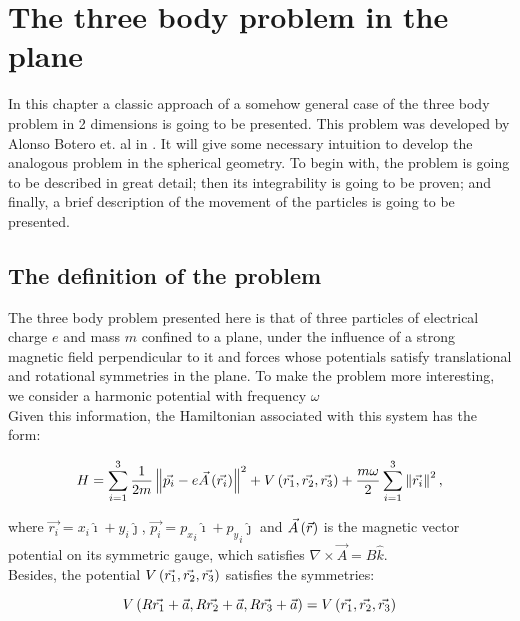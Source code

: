 \chapter{The three body problem in the plane}

In this chapter a classic approach of a somehow general case of the three body problem in 2 dimensions is going to be presented. This problem was developed by Alonso Botero et. al in \cite{alonso}. It will give some necessary intuition to develop the analogous problem in the spherical geometry. To begin with, the problem is going to be described in great detail; then its integrability is going to be proven; and finally, a brief description of the movement of the particles is going to be presented.\\

\section{The definition of the problem}

The three body problem presented here is that of three particles of electrical charge $e$ and mass $m$ confined to a plane, under the influence of a strong magnetic field perpendicular to it and forces whose potentials satisfy translational and rotational symmetries in the plane. To make the problem more interesting, we consider a harmonic potential with frequency $\omega$\\

Given this information, the Hamiltonian associated with this system has the form:

\begin{equation}
H = \sum_{i=1}^{3} \frac{1}{2m} \left\lVert  \vec{p_i} - 
e\vec{ A } \left( \vec{r_i} \right) \right\rVert^2
+ V \left(  \vec{r_1},\vec{r_2},\vec{r_3}  \right)
+\frac{m\omega}{2}\sum_{i=1}^{3} \left\lVert \vec{r_i} \right\rVert^2,
\label{eq:ham2d}
\end{equation}

where $\vec{r_i} = x_i \hat{\imath} + y_i \hat{\jmath}$, $\vec{p_i} = {p_x}_i\hat{\imath} + {p_y}_i\hat{\jmath}$ and $\vec{A}\left( \vec{r} \right)$ is the magnetic vector potential on its symmetric gauge, which satisfies $\nabla \times \vec{A} = B\hat{k}$.\\

Besides, the potential $V \left(  \vec{r_1},\vec{r_2},\vec{r_3}  \right)$ satisfies the symmetries:

\begin{equation}
V \left(  R\vec{r_1}+\vec{a},R\vec{r_2}+\vec{a},R\vec{r_3}+\vec{a}   \right)= V \left(  \vec{r_1},\vec{r_2},\vec{r_3}  \right)
\label{eq:vsym}
\end{equation}

